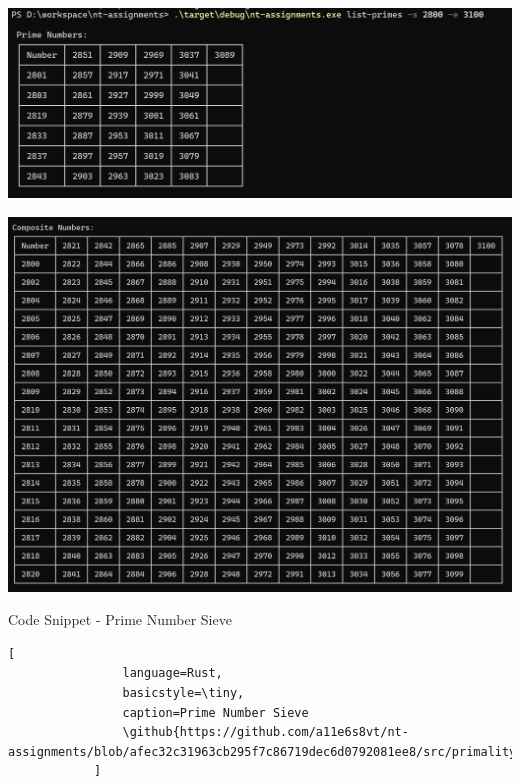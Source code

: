 \documentclass[11pt,a4paper]{article}
\newcommand{\github}[1]{%
	\href{#1}{\faGithubSquare}%
}
\begin{document}
\begin{enumerate}[1.]
\begin{flushleft}
			\begin{minipage}{\linewidth}
				\begin{center}
					\includegraphics[scale=.45]{primes.png}
					\label{figure1:primes}
				\end{center}
			\end{minipage}
			
			\bigbreak
			\bigbreak
			\begin{minipage}{\linewidth}
				\begin{center}
				\includegraphics[scale=.45]{composites.png}
				\label{figure2:composites}
				\end{center}
			\end{minipage}
			
			\bigbreak
			\bigbreak
			Code Snippet - Prime Number Sieve
			\begin{lstlisting}[
				language=Rust, 
				basicstyle=\tiny, 
				caption=Prime Number Sieve
				\github{https://github.com/a11e6s8vt/nt-assignments/blob/afec32c31963cb295f7c86719dec6d0792081ee8/src/primality.rs\#L57}        
			]


\end{lstlisting}
\end{flushleft}
\end{enumerate}
\end{document}
